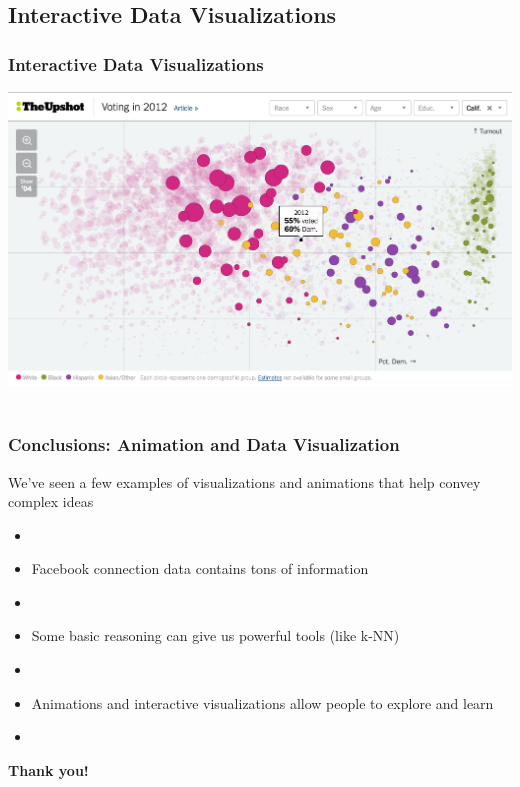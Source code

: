 \documentclass{beamer} %
\newcommand{\1}{\mathbb{1}}
\begin{document}
\subsection{Interactive Data Visualizations}
\begin{frame}[t]\frametitle{Interactive Data Visualizations}
\includegraphics[scale = 0.33]{./visualization/voting_habits_viz.png}\\
\href{http://www.nytimes.com/interactive/2016/06/10/upshot/voting-habits-turnout-partisanship.html}
{}\\	
\end{frame}














\begin{frame}[t]\frametitle{Conclusions: Animation and Data Visualization}
{\large{We've seen a few examples of visualizations and animations that help convey complex ideas}}
\begin{itemize}
	\item[]
	\item Facebook connection data contains tons of information
	\item[]
\pause
	\item Some basic reasoning can give us powerful tools (like k-NN)
	\item[]
\pause
	\item Animations and interactive visualizations allow people to explore and learn
	\item[]
\end{itemize}
\pause
{\bf{\Large{Thank you!}}}
\end{frame}
\end{document}

